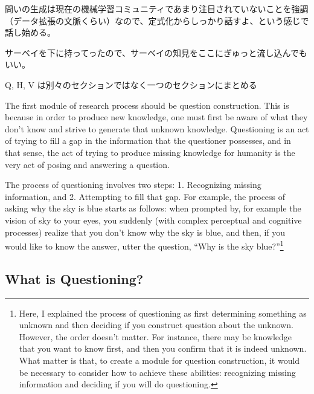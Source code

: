 問いの生成は現在の機械学習コミュニティであまり注目されていないことを強調（データ拡張の文脈くらい）なので、定式化からしっかり話すよ、という感じで話し始める。

サーベイを下に持ってったので、サーベイの知見をここにぎゅっと流し込んでもいい。

Q, H, V は別々のセクションではなく一つのセクションにまとめる


The first module of research process should be question construction. This is because in order to produce new knowledge, one must first be aware of what they don't know and strive to generate that unknown knowledge. Questioning is an act of trying to fill a gap in the  information that the questioner possesses, and in that sense, the act of trying to produce missing knowledge for humanity is the very act of posing and answering a question.



The process of questioning involves two steps: 1. Recognizing missing information, and 2. Attempting to fill that gap. For example, the process of asking why the sky is blue starts as follows: when prompted by, for example the vision of sky to your eyes, you suddenly (with complex perceptual and cognitive processes) realize that you don't know why the sky is blue, and then, if you would like to know the answer, utter the question, ``Why is the sky blue?''\footnote{
Here, I explained the process of questioning as first determining something as unknown and then deciding if you construct question about the unknown. However, the order doesn't matter. For instance, there may be knowledge that you want to know first, and then you confirm that it is indeed unknown. What matter is that, to create a module for question construction, it would be necessary to consider how to achieve these abilities: recognizing missing information and deciding if you will do questioning. 
}

\subsection{What is Questioning?}
